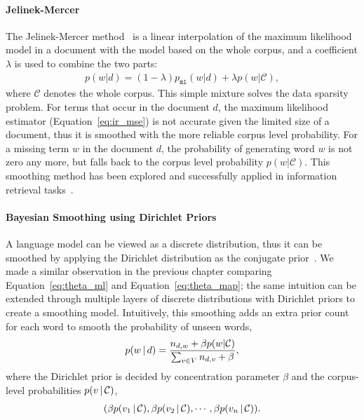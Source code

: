 \paragraph{Jelinek-Mercer}

The Jelinek-Mercer method~\citep{Jelinek-1980} is a linear
interpolation of the maximum likelihood model in a document with the
model based on the whole corpus, and a coefficient $\lambda$ is used
to combine the two parts:
\begin{align}
p(w|d) = (1 - \lambda) p_{\texttt{ml}}(w|d) + \lambda p(w|\mathcal{C}),
\label{eq:lm-jr}
\end{align}
where $\mathcal{C}$ denotes the whole corpus. This simple mixture
solves the data sparsity problem. For terms that occur in the document
$d$, the maximum likelihood estimator (Equation~\ref{eq:ir_mse}) is
not accurate given the limited size of a document, thus it is smoothed
with the more reliable corpus level probability. For a missing term
$w$ in the document $d$, the probability of generating word $w$ is not
zero any more, but falls back to the corpus level probability
$p(w|\mathcal{C})$.  This smoothing method has been explored and
successfully applied in information retrieval
tasks~\citep{PonteCroft,song-99}.

\paragraph{Bayesian Smoothing using Dirichlet Priors}

A language model can be viewed as a discrete distribution, thus it can
be smoothed by applying the Dirichlet distribution as the conjugate
prior~\citep{mackay95dirichlet}. We made a similar observation in the
previous chapter comparing Equation~\ref{eq:theta_ml} and
Equation~\ref{eq:theta_map}; the same intuition can be extended
through multiple layers of discrete distributions with Dirichlet
priors to create a smoothing model. Intuitively, this smoothing adds
an extra prior count for each word to smooth the probability of unseen
words,
\begin{align}
p(w \, | \, d) = \frac{n_{d,w} + \beta p(w|\mathcal{C})}{\sum_{v \in V} n_{d,v} + \beta},
\end{align}
where the Dirichlet prior is decided by concentration parameter $\beta$ and the
corpus-level probabilities $p(v \, | \, \mathcal{C})$,
\begin{align}
(\beta p(v_1 \, | \, \mathcal{C}), \beta p(v_2 \, | \, \mathcal{C}), \cdots, \beta p(v_n \, | \, \mathcal{C})).
\label{eq:lm-bs}
\end{align}


